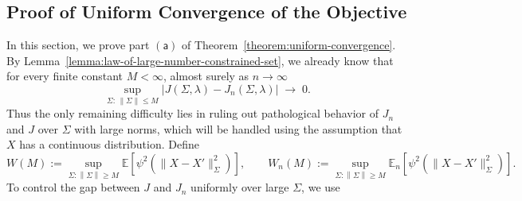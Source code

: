\documentclass[sn-mathphys-num]{sn-jnl}%
\numberwithin{equation}{section}
\newcommand{\E}{\mathbb{E}}
\newcommand{\norm}[1]{\left\|{#1}\right\|} %
\theoremstyle{thmstyleone}%
\theoremstyle{thmstyletwo}%
\theoremstyle{thmstylethree}%
\begin{document}
\subsection{Proof of Uniform Convergence of the Objective}
\indent\indent
In this section, we prove part $\mathsf{(a)}$ of Theorem~\ref{theorem:uniform-convergence}.
By Lemma~\ref{lemma:law-of-large-number-constrained-set}, we already know that for every finite constant $M < \infty$, almost surely as $n \to \infty$
\begin{equation}
	\sup_{\Sigma:\,\|\Sigma\| \le M} 
	\bigl|J(\Sigma, \lambda) - J_n(\Sigma, \lambda)\bigr|
	\;\longrightarrow\; 0.
\end{equation}
Thus the only remaining difficulty lies in ruling out pathological behavior of $J_n$ and $J$
over $\Sigma$ with large norms, which will be handled using the assumption that $X$ has a 
continuous distribution.
Define
\begin{equation}
\label{eqn:U-U-n-definition}
	W(M) :=  \sup_{\Sigma: \norm{\Sigma} \ge M}
	\E\!\left[\psi^2\!\left(\|X - X'\|_{\Sigma}^2\right)\right], \qquad 
	W_n(M) :=  \sup_{\Sigma: \norm{\Sigma} \ge M}
	\E_n\!\left[\psi^2\!\left(\|X - X'\|_{\Sigma}^2\right)\right].
\end{equation}
To control the gap between $J$ and $J_n$ uniformly over large $\Sigma$, we use
\vspace{.5em} 
\end{document}
